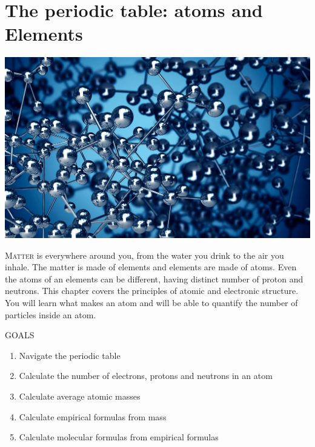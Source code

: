 \documentclass[main.tex]{subfiles}
\begin{document}
\linenumbers


\chapter[The periodic table: atoms and Elements]{The periodic table: atoms and Elements}

\begin{marginfigure}
      \includegraphics{chapter0.5/figure1}
      \label{fig:marginfig1}
   \end{marginfigure}
\lettrine[lines=4]{\color{black!45}M}{atter} is everywhere around you, from the water you drink to the air you inhale. The matter is made of elements and elements are made of atoms. Even the atoms of an elements can be different, having distinct number of proton and neutrons. This chapter covers the principles of atomic and electronic structure. You will learn what makes an atom and will be able to quantify the number of particles inside an atom. %
\begin{marginfigure}%
\begin{mytcbox}{GOALS}
\begin{enumerate}[label=\protect\circled{\color{white}\arabic*}]
\item Navigate the periodic table
\item Calculate the number of electrons, protons and neutrons in an atom
\item  Calculate average atomic masses
\item  Calculate empirical formulas from mass
\item  Calculate molecular formulas from empirical formulas
\end{enumerate}
\end{mytcbox}
\end{marginfigure}%
\end{document}
